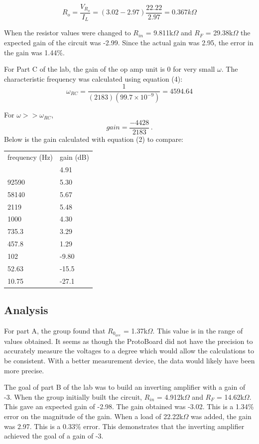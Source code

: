 \documentclass[twocolumn, amsmath]{revtex4}
\begin{document}
$$R_{o} =  \frac{V_{R_{o}}}{I_{L}} = (3.02 - 2.97)\frac{22.22}{2.97} = 0.367k\Omega$$

When the resistor values were changed to $R_{in}$ = 9.811k$\Omega$ and $R_{F}$ = 29.38k$\Omega$ the expected gain of the circuit was -2.99. Since the actual gain was 2.95, the error in the gain was 1.44\%. 

For Part C of the lab, the gain of the op amp unit is 0 for very small $\omega$. The characteristic frequency was calculated using equation (4):
$$ \omega_{RC} =  \frac{1}{(2183)(99.7\times10^{-9})}=4594.64 $$

For $\omega >> \omega_{RC}$,
$$gain = \frac{-4428}{2183} \, .$$
Below is the gain calculated with equation (2) to compare:

\begin{center}
	\begin{ruledtabular}
    \begin{tabular}{ l l }
	frequency (Hz) & gain (dB) \\ \colrule
	102000 & 4.91 \\
	92590 & 5.30  \\
	58140 & 5.67 \\
	2119 & 5.48 \\
	1000 & 4.30 \\
	735.3 & 3.29 \\
	457.8 & 1.29 \\
	102 & -9.80 \\
	52.63 & -15.5 \\
	10.75 & -27.1 \\
\end{tabular}
    \end{ruledtabular}
\end{center}



\subsection{Analysis}
For part A, the group found that $R_{0_{ave}}$ = 1.37k$\Omega$. This value is in the range of values obtained. It seems as though the ProtoBoard did not have the precision to accurately measure the voltages to a degree which would allow the calculations to be consistent. With a better measurement device, the data would likely have been more precise.

The goal of part B of the lab was to build an inverting amplifier with a gain of -3. When the group initially built the circuit, $R_{in}$ = 4.912k$\Omega$ and $R_{F}$ = 14.62k$\Omega$. This gave an expected gain of -2.98. The gain obtained was -3.02. This is a 1.34\% error on the magnitude of the gain. When a load of 22.22k$\Omega$ was added, the gain was 2.97. This is a 0.33\% error. This demonstrates that the inverting amplifier achieved the goal of a gain of -3. 
\end{document}
